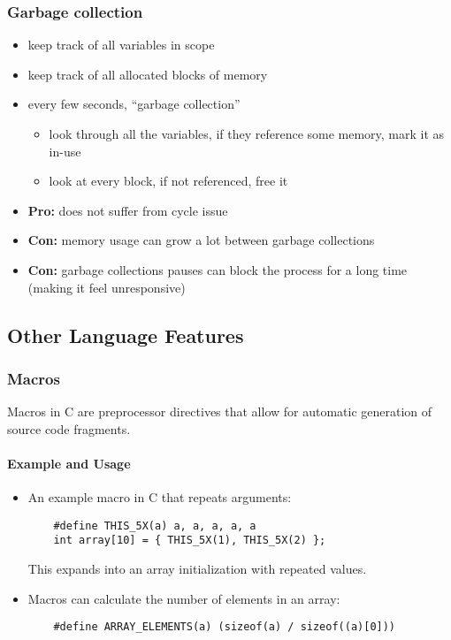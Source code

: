 \documentclass[12pt]{article}
\begin{document}





\subsubsection{Garbage collection}

\begin{itemize}
  \item keep track of all variables in scope
  \item keep track of all allocated blocks of memory
  \item every few seconds, ``garbage collection''
    \begin{itemize}
      \item look through all the variables, if they reference some memory, mark it as in-use
      \item look at every block, if not referenced, free it
    \end{itemize}
\end{itemize}

\begin{itemize}
  \item \textbf{Pro:} does not suffer from cycle issue
  \item \textbf{Con:} memory usage can grow a lot between garbage collections
  \item \textbf{Con:} garbage collections pauses can block the process for a long time (making it feel unresponsive)
\end{itemize}

\subsection{Other Language Features}


\subsubsection{Macros}
Macros in C are preprocessor directives that allow for automatic generation of source code fragments.

\paragraph{Example and Usage}
\begin{itemize}
    \item An example macro in C that repeats arguments:
    \begin{verbatim}
    #define THIS_5X(a) a, a, a, a, a
    int array[10] = { THIS_5X(1), THIS_5X(2) };
    \end{verbatim}
    This expands into an array initialization with repeated values.

    \item Macros can calculate the number of elements in an array:
    \begin{verbatim}
    #define ARRAY_ELEMENTS(a) (sizeof(a) / sizeof((a)[0]))
    \end{verbatim}
\end{itemize}
\end{document}
